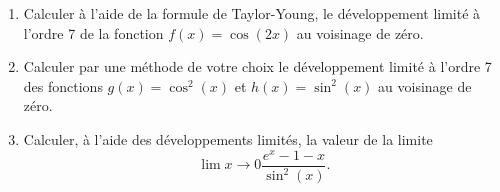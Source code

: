 
\begin{exercice}\label{exosession1-0008}

  \begin{enumerate}
  \item Calculer à l'aide de la formule de Taylor-Young, le développement limité à l'ordre 7 de la fonction $f(x) = \cos(2x)$  au voisinage de zéro.
  \item Calculer par une méthode de votre choix le développement limité à l'ordre 7 des fonctions $g(x) = \cos^2(x)$ et $h(x) = \sin^2(x)$   au voisinage de zéro.
  \item Calculer, à l'aide des développements limités, la valeur de la limite
    \begin{equation*}
      \lim{x\to 0}\frac{e^x-1-x}{\sin^2(x)}.
    \end{equation*}
  \end{enumerate}


\end{exercice}

